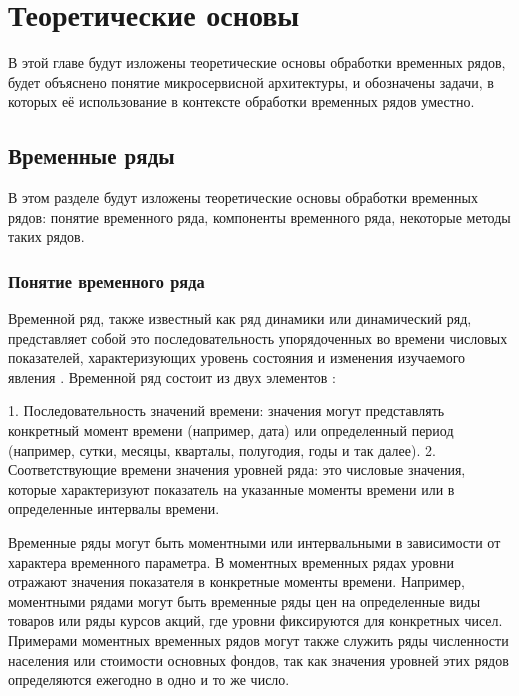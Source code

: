 \chapter{Теоретические основы}
\label{chapter1}

\begin{annotation}
	В этой главе будут изложены теоретические основы обработки временных рядов, будет объяснено понятие микросервисной архитектуры, и обозначены задачи, в которых её использование в контексте обработки временных рядов уместно.
\end{annotation}

\section{Временные ряды}
\begin{annotation}
	В этом разделе будут изложены теоретические основы обработки временных рядов: понятие временного ряда, компоненты временного ряда, некоторые методы таких рядов. 
\end{annotation}

\subsection{Понятие временного ряда}
Временной ряд, также известный как ряд динамики или динамический ряд, представляет собой это последовательность упорядоченных во времени числовых показателей, характеризующих уровень состояния и изменения изучаемого явления \cite{афанасьев2010анализ}.
Временной ряд состоит из двух элементов \cite{афанасьев2010анализ}:

1. Последовательность значений времени: значения могут представлять конкретный момент времени (например, дата) или определенный период (например, сутки, месяцы, кварталы, полугодия, годы и так далее).
2. Соответствующие времени значения уровней ряда: это числовые значения, которые характеризуют показатель на указанные моменты времени или в определенные интервалы времени.

Временные ряды могут быть моментными или интервальными \cite{афанасьев2010анализ} в зависимости от характера временного параметра. В моментных временных рядах уровни отражают значения показателя в конкретные моменты времени. Например, моментными рядами могут быть временные ряды цен на определенные виды товаров или ряды курсов акций, где уровни фиксируются для конкретных чисел. Примерами моментных временных рядов могут также служить ряды численности населения или стоимости основных фондов, так как значения уровней этих рядов определяются ежегодно в одно и то же число.

